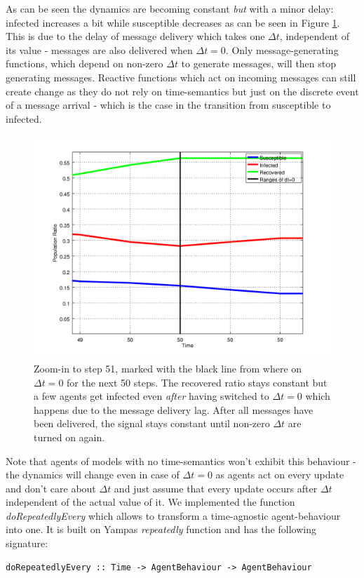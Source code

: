 As can be seen  the dynamics are becoming constant \textit{but} with a minor delay: infected increases a bit while susceptible decreases as can be seen in Figure \ref{fig:sir_abs_zero_dt_zoom}. This is due to the delay of message delivery which takes one $\Delta t$, independent of its value - messages are also delivered when $\Delta t = 0$. Only message-generating functions, which depend on non-zero $\Delta t$ to generate messages, will then stop generating messages. Reactive functions which act on incoming messages can still create change as they do not rely on time-semantics but just on the discrete event of a message arrival - which is the case in the transition from susceptible to infected.

\begin{figure}
	\centering
	\includegraphics[width=.4\textwidth, angle=0]{./../shared/fig/dtzero/SIR_ABS_zeroDt_mid_zoom.png}
	\caption{Zoom-in to step 51, marked with the black line from where on $\Delta t = 0$ for the next 50 steps. The recovered ratio stays constant but a few agents get infected even \textit{after} having switched to $\Delta t = 0$ which happens due to the message delivery lag. After all messages have been delivered, the signal stays constant until non-zero $\Delta t$ are turned on again.}
	\label{fig:sir_abs_zero_dt_zoom}
\end{figure}

Note that agents of models with no time-semantics won't exhibit this behaviour - the dynamics will change even in case of $\Delta t = 0$ as agents act on every update and don't care about $\Delta t$ and just assume that every update occurs after $\Delta t$ independent of the actual value of it. We implemented the function \textit{doRepeatedlyEvery} which allows to transform a time-agnostic agent-behaviour into one. It is built on Yampas \textit{repeatedly} function and has the following signature:

\begin{verbatim}
doRepeatedlyEvery :: Time -> AgentBehaviour -> AgentBehaviour
\end{verbatim}

